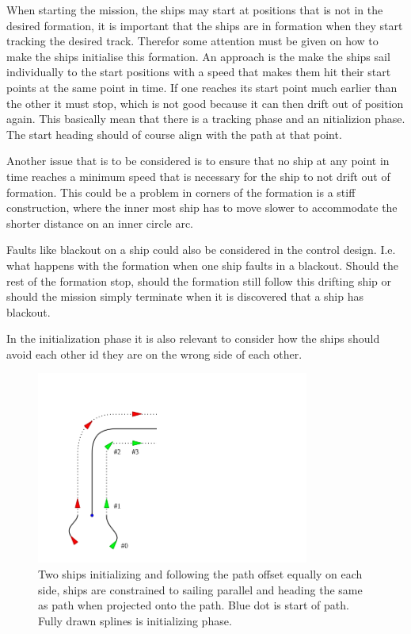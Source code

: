When starting the mission, the ships may start at positions that
is not in the desired formation, it is important that the ships are in
formation when they start tracking the desired track. Therefor some
attention must be given on how to make the ships initialise this
formation. An approach is the make the ships sail individually to the
start positions with a speed that makes them hit their start points at
the same point in time. If one reaches its start point much earlier
than the other it must stop, which is not good because it can then
drift out of position again. This basically mean that there is a
tracking phase and an nitializion phase. The start heading should of
course align with the path at that point.

Another issue that is to be considered is to ensure that no ship at
any point in time reaches a minimum speed that is necessary for the
ship to not drift out of formation. This could be a problem in corners
of the formation is a stiff construction, where the inner most ship
has to move slower to accommodate the shorter distance on an inner
circle arc.

Faults like blackout on a ship could also be considered in the control
design. I.e. what happens with the formation when one ship faults in a
blackout. Should the rest of the formation stop, should the formation
still follow this drifting ship or should the mission simply terminate
when it is discovered that a ship has blackout.

In the initialization phase it is also relevant to consider how the
ships should avoid each other id they are on the wrong side of each
other.

\begin{figure}[htbp]
	\centering
	\includegraphics[width=0.8\textwidth]{fig/cornoring}
	\caption{Two ships initializing and following the path offset
		equally on each side, ships are constrained to sailing parallel
		and heading the same as path when projected onto the path. Blue
	dot is start of path. Fully drawn splines is initializing phase.}
	\label{fig:carnoring}
\end{figure}
